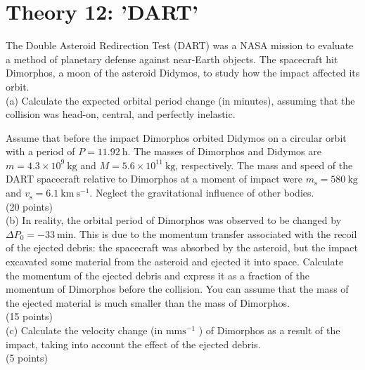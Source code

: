 \documentclass[10pt]{article}
\begin{document}
\section*{Theory 12: 'DART'}
The Double Asteroid Redirection Test (DART) was a NASA mission to evaluate a method of planetary defense against near-Earth objects. The spacecraft hit Dimorphos, a moon of the asteroid Didymos, to study how the impact affected its orbit.\\
(a) Calculate the expected orbital period change (in minutes), assuming that the collision was head-on, central, and perfectly inelastic.

Assume that before the impact Dimorphos orbited Didymos on a circular orbit with a period of $P=11.92 \mathrm{~h}$. The masses of Dimorphos and Didymos are $m=4.3 \times 10^{9} \mathrm{~kg}$ and $M=5.6 \times 10^{11} \mathrm{~kg}$, respectively. The mass and speed of the DART spacecraft relative to Dimorphos at a moment of impact were $m_{\mathrm{s}}=580 \mathrm{~kg}$ and $v_{\mathrm{s}}=6.1 \mathrm{~km} \mathrm{~s}^{-1}$. Neglect the gravitational influence of other bodies.\\
(20 points)\\
(b) In reality, the orbital period of Dimorphos was observed to be changed by $\Delta P_{0}=-33 \mathrm{~min}$. This is due to the momentum transfer associated with the recoil of the ejected debris: the spacecraft was absorbed by the asteroid, but the impact excavated some material from the asteroid and ejected it into space. Calculate the momentum of the ejected debris and express it as a fraction of the momentum of Dimorphos before the collision. You can assume that the mass of the ejected material is much smaller than the mass of Dimorphos.\\
(15 points)\\
(c) Calculate the velocity change (in $\mathrm{mm} \mathrm{s}^{-1}$ ) of Dimorphos as a result of the impact, taking into account the effect of the ejected debris.\\
(5 points)\\
\end{document}
